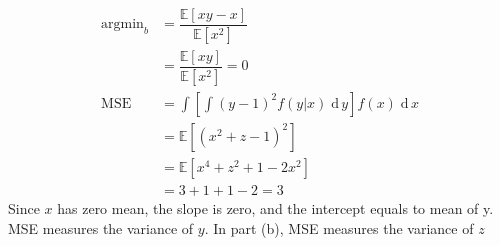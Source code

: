 \documentclass{article}
\newcommand{\dx}{\;\mathrm{d}\,x}
\newcommand{\dm}[1]{\;\mathrm{d}\,{}#1}
\newcommand{\mbe}[1]{\mathbb{E}\left[{}#1\right]}
\newcommand{\argmin}[1]{\mathop{\arg\min}_{{}#1}}
\begin{document}
\begin{CJK*}{GBK}{song}
\begin{enumerate}
\begin{align*}
    \argmin b&=\dfrac{\mbe{xy-x}}{\mbe{x^2}}\\
    &=\dfrac{\mbe{xy}}{\mbe{x^2}}=0\\
    \mathrm{MSE}&=\int\left[\int(y-1)^2f(y|x)\dm y\right]f(x)\dx\\
    &=\mbe{(x^2+z-1)^2}\\
    &=\mbe{x^4+z^2+1-2x^2}\\
    &=3+1+1-2=3
\end{align*}
Since $x$ has zero mean, the slope is zero, and the intercept equals to mean of y. MSE measures the variance of $y$.
In part (b), MSE measures the variance of $z$
\end{enumerate}
\end{CJK*}
\end{document}
